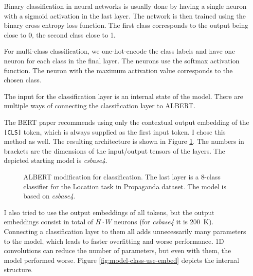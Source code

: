\documentclass[
  printed, %
  color,   %
  table,   %
  oneside, %
  lof,     %
  lot,     %
]{fithesis3}
\begin{document}
Binary classification in neural networks is usually done by having a single neuron with a sigmoid activation in the last layer. The network is then trained using the binary cross entropy loss function. The first class corresponds to the output being close to 0, the second class close to 1.

For multi-class classification, we one-hot-encode the class labels and have one neuron for each class in the final layer. The neurons use the softmax activation function. The neuron with the maximum activation value corresponds to the chosen class.

The input for the classification layer is an internal state of the model. There are multiple ways of connecting the classification layer to ALBERT.

\clearpage
{\parindent=0pt
    The BERT paper \parencite{bert} recommends using only the contextual output embedding of the \texttt{[CLS]} token, which is always supplied as the first input token. I chose this method as well. The resulting architecture is shown in Figure \ref{fig:class-basic}. The numbers in brackets are the dimensions of the input/output tensors of the layers. The depicted starting model is \textit{csbase4}.
}

\begin{figure}[h]
    \caption[ALBERT classification model -- basic]{
        ALBERT modification for classification. The last layer is a 8-class classifier for the Location task in Propaganda dataset. The model is based on \textit{csbase4}.
    }
    \label{fig:class-basic}
    \centering
\end{figure}

I also tried to use the output embeddings of all tokens, but the output embeddings consist in total of $H \cdot W$ neurons (for \textit{csbase4} it is 200~K). Connecting a classification layer to them all adds unnecessarily many parameters to the model, which leads to faster overfitting and worse performance. 1D convolutions can reduce the number of parameters, but even with them, the model performed worse. Figure \ref{fig:model-class-use-embed} depicts the internal structure.
\end{document}
